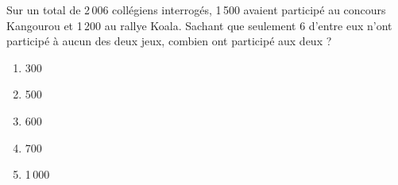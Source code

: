 Sur un total de 2\,006 collégiens interrogés, 1\,500 avaient participé au
concours Kangourou et 1\,200 au rallye Koala. Sachant que seulement 6
d'entre eux n'ont participé à aucun des deux jeux, combien ont
participé aux deux ?
\begin{multicols}{5}
  \begin{enumerate}[A/]
  \item 300
  \item 500
  \item 600
  \item 700
  \item 1\,000
  \end{enumerate}
\end{multicols}